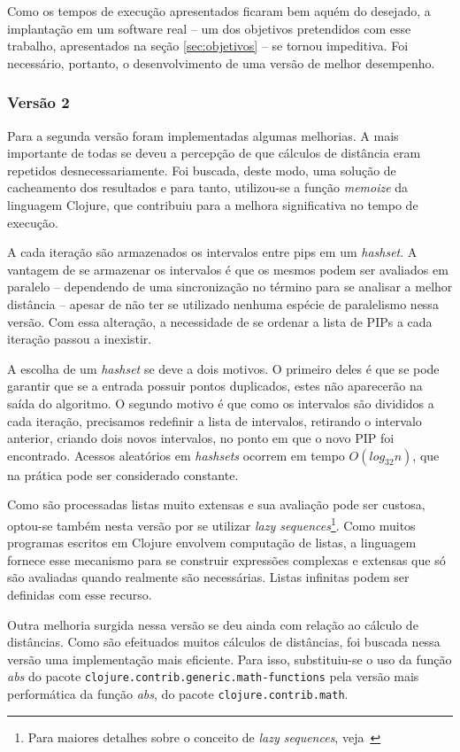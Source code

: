 Como os tempos de execução apresentados ficaram bem aquém do desejado, a implantação em um software real -- um dos objetivos pretendidos com esse trabalho, apresentados na seção \ref{sec:objetivos} -- se tornou impeditiva.  Foi necessário, portanto, o desenvolvimento de uma versão de melhor desempenho.


\subsubsection{Versão 2}
Para a segunda versão foram implementadas algumas melhorias. A mais importante de todas se deveu a percepção de que cálculos de distância eram repetidos desnecessariamente. Foi buscada, deste modo, uma solução de cacheamento dos resultados e para tanto, utilizou-se a função \textit{memoize} da linguagem Clojure, que contribuiu para a melhora significativa no tempo de execução.

A cada iteração são armazenados os intervalos entre pips em um \textit{hashset}. A vantagem de se armazenar os intervalos é que os mesmos podem ser avaliados em paralelo -- dependendo de uma sincronização no término para se analisar a melhor distância -- apesar de não ter se utilizado nenhuma espécie de paralelismo nessa versão. Com essa alteração, a necessidade de se ordenar a lista de PIPs a cada iteração passou a inexistir. 

A escolha de um \textit{hashset} se deve a dois motivos. O primeiro deles é que se pode garantir que se a entrada possuir pontos duplicados, estes não aparecerão na saída do algoritmo. O segundo motivo é que como os intervalos são divididos a cada iteração, precisamos redefinir a lista de intervalos, retirando o intervalo anterior, criando dois novos intervalos, no ponto em que o novo PIP foi encontrado. Acessos aleatórios em \textit{hashsets} ocorrem em tempo $O(log_{32}n)$, que na prática pode ser considerado constante.


Como são processadas listas muito extensas e sua avaliação pode ser custosa, optou-se também nesta versão por se utilizar \textit{lazy sequences}\footnote{Para maiores detalhes sobre o conceito de \textit{lazy sequences}, veja~\cite{programmingclojure}}. Como muitos programas escritos em Clojure envolvem computação de listas, a linguagem fornece esse mecanismo para se construir expressões complexas e extensas que só são avaliadas quando realmente são necessárias. Listas infinitas podem ser definidas com esse recurso.

Outra melhoria surgida nessa versão se deu ainda com relação ao cálculo de distâncias. Como são efeituados muitos cálculos de distâncias, foi buscada nessa versão uma implementação mais eficiente. Para isso, substituiu-se o uso da função \textit{abs} do pacote \verb+clojure.contrib.generic.math-functions+ pela versão mais performática da função \textit{abs}, do pacote \verb+clojure.contrib.math+.

